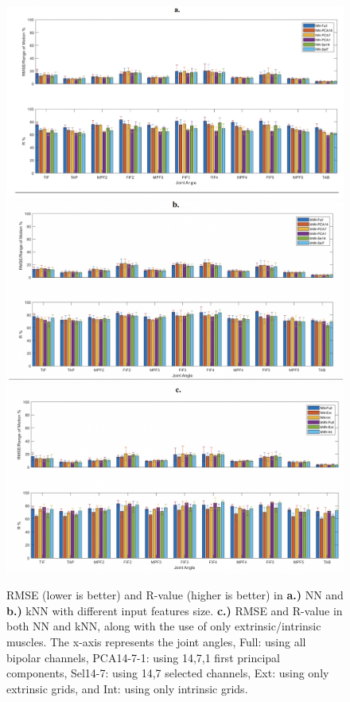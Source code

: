 \documentclass[conference]{IEEEtran}
\begin{document}
\begin{figure}
    \centering
    \includegraphics[width=\columnwidth]{figure7.png}
    \includegraphics[width=\columnwidth]{figure8.png}
    \includegraphics[width=\columnwidth]{figure9.png}
    \caption{RMSE (lower is better) and R-value (higher is better) in \textbf{a.)} NN and \textbf{b.)} kNN with different input features size. \textbf{c.)} RMSE and R-value in both NN and kNN, along with the use of only extrinsic/intrinsic muscles. The x-axis represents 
the joint angles, Full: using all bipolar channels, PCA14-7-1: using 14,7,1 first principal components, 
Sel14-7: using 14,7 selected channels, Ext: using only extrinsic grids, and Int: using only intrinsic grids.
}
    \label{figure7}
\end{figure}
\end{document}
